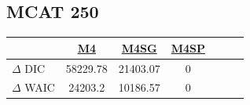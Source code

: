 \documentclass[ xcolor = pdftex, dvipsnames, table ]{beamer}
\begin{document}
%
%

\subsection{MCAT 250}
\begin{frame}{}
	\begin{table}[ht!]
        \centering
        \begin{tabular}[c]{@{}lcccccc@{}}
        \hline
        & \href{https://github.com/gasduster99/sppComp/tree/master/sscRuns/25019781982M4}{M4} & \href{https://github.com/gasduster99/sppComp/tree/master/sscRuns/25019781982M4IGSG}{M4SG} & \href{https://github.com/gasduster99/sppComp/tree/master/sscRuns/25019781982M4IGSP}{M4SP} \\ \hline %
	\(\Delta\) DIC & 58229.78 & 21403.07 & 0 \\
	\(\Delta\) WAIC & 24203.2 & 10186.57 & 0 \\ \hline
	\end{tabular}
        \end{table}
\end{frame}

%
%
\end{document}
